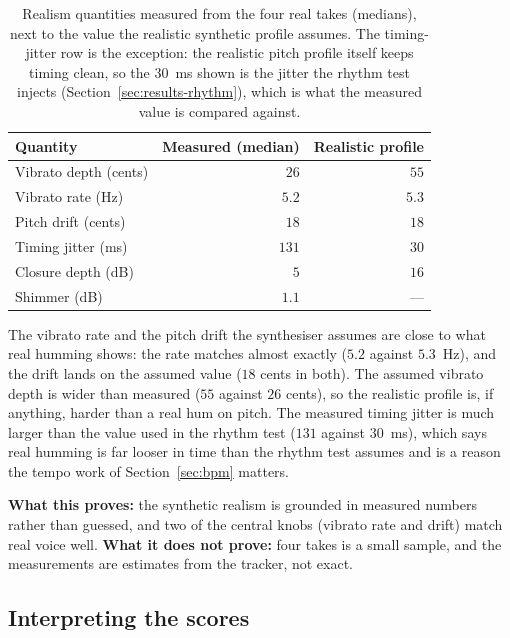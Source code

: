 \documentclass[12pt,a4paper]{article}
\begin{document}
\begin{table}[H]
\centering
\caption{Realism quantities measured from the four real takes (medians), next to
the value the realistic synthetic profile assumes. The timing-jitter row is the
exception: the realistic pitch profile itself keeps timing clean, so the $30$~ms
shown is the jitter the rhythm test injects (Section~\ref{sec:results-rhythm}),
which is what the measured value is compared against.}
\label{tab:calib}
\begin{tabular}{l r r}
\toprule
\textbf{Quantity} & \textbf{Measured (median)} & \textbf{Realistic profile} \\
\midrule
Vibrato depth (cents) & $26$  & $55$ \\
Vibrato rate (Hz)     & $5.2$ & $5.3$ \\
Pitch drift (cents)   & $18$  & $18$ \\
Timing jitter (ms)    & $131$ & $30$ \\
Closure depth (dB)    & $5$   & $16$ \\
Shimmer (dB)          & $1.1$ & --- \\
\bottomrule
\end{tabular}
\end{table}

The vibrato rate and the pitch drift the synthesiser assumes are close to what
real humming shows: the rate matches almost exactly ($5.2$ against $5.3$~Hz), and
the drift lands on the assumed value ($18$ cents in both). The assumed vibrato
depth is wider than measured ($55$ against $26$ cents), so the realistic profile
is, if anything, harder than a real hum on pitch. The measured timing jitter is
much larger than the value used in the rhythm test ($131$ against $30$~ms), which
says real humming is far looser in time than the rhythm test assumes and is a
reason the tempo work of Section~\ref{sec:bpm} matters.

\textbf{What this proves:} the synthetic realism is grounded in measured numbers
rather than guessed, and two of the central knobs (vibrato rate and drift) match
real voice well. \textbf{What it does not prove:} four takes is a small sample,
and the measurements are estimates from the tracker, not exact.

\subsection{Interpreting the scores}
\label{sec:interpret}
\end{document}
